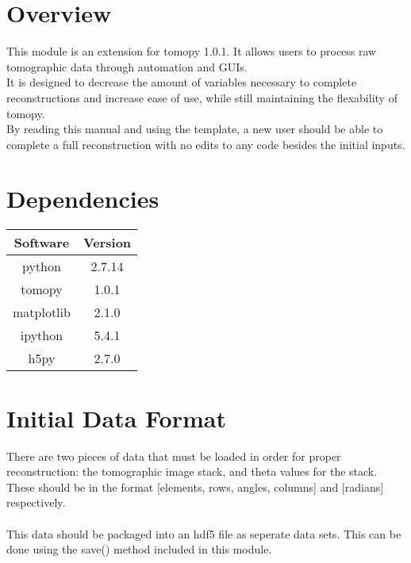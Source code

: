 \documentclass[10pt]{article}
\begin{document}
\maketitle

\section*{Overview}
This module is an extension for tomopy 1.0.1. It allows users to process raw tomographic data
through automation and GUIs.\\

\noindent It is designed to decrease the amount of variables necessary to complete reconstructions 
and increase ease of use, while still maintaining the flexability of tomopy.\\

\noindent By reading this manual and using the template, a new user should be able to complete a full
reconstruction with no edits to any code besides the initial inputs.
\section*{Dependencies}
\begin{table}[ht]
    \centering %
    \begin{tabular}{c c}
    \hline\hline %
    Software & Version\\ [0.5ex] %
    \hline %
    python & 2.7.14\\ %
    tomopy & 1.0.1\\
    matplotlib & 2.1.0\\
    ipython & 5.4.1\\
    h5py & 2.7.0\\ [1ex] %
    \hline %
    \end{tabular}
\end{table}

\section*{Initial Data Format} There are two pieces of data that must be loaded in order for proper reconstruction: 
the tomographic image stack, and theta values for the stack. 
These should be in the format [elements, rows, angles, columns] and [radians] respectively.\\
\ \\This data should be packaged into an hdf5 file as seperate data sets. This can be done using the save() method included in this module.
\end{document}
